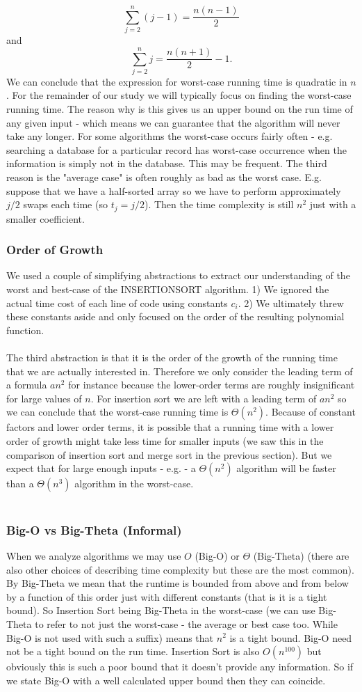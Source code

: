 \documentclass{scrartcl}
\theoremstyle{definition}
\theoremstyle{definition}
\theoremstyle{remark}
\numberwithin{equation}{section}
\begin{document}
$$\sum_{j=2}^n(j-1)=\frac{n(n-1)}{2}$$
and
$$\sum_{j=2}^nj=\frac{n(n+1)}{2}-1.$$
We can conclude that the expression for worst-case running time is quadratic in $n$. For the remainder of our study we will typically focus on finding the worst-case running time. The reason why is this gives us an upper bound on the run time of any given input - which means we can guarantee that the algorithm will never take any longer. For some algorithms the worst-case occurs fairly often - e.g. searching a database for a particular record has worst-case occurrence when the information is simply not in the database. This may be frequent. The third reason is the "average case" is often roughly as bad as the worst case. E.g. suppose that we have a half-sorted array so we have to perform approximately $j/2$ swaps each time (so $t_j=j/2$). Then the time complexity is still $n^2$ just with a smaller coefficient.
\subsubsection{Order of Growth}
We used a couple of simplifying abstractions to extract our understanding of the worst and best-case of the INSERTIONSORT algorithm. 1) We ignored the actual time cost of each line of code using constants $c_i$. 2) We ultimately threw these constants aside and only focused on the order of the resulting polynomial function.\\
\\
The third abstraction is that it is the order of the growth of the running time that we are actually interested in. Therefore we only consider the leading term of a formula $an^2$ for instance because the lower-order terms are roughly insignificant for large values of $n$. For insertion sort we are left with a leading term of $an^2$ so we can conclude that the worst-case running time is $\Theta(n^2)$. Because of constant factors and lower order terms, it is possible that a running time with a lower order of growth might take less time for smaller inputs (we saw this in the comparison of insertion sort and merge sort in the previous section). But we expect that for large enough inputs - e.g. - a $\Theta(n^2)$ algorithm will be faster than a $\Theta(n^3)$ algorithm in the worst-case.\\
\\
\subsubsection{Big-O vs Big-Theta (Informal)}
When we analyze algorithms we may use $O$ (Big-O) or $\Theta$ (Big-Theta) (there are also other choices of describing time complexity but these are the most common). By Big-Theta we mean that the runtime is bounded from above and from below by a function of this order just with different constants (that is it is a tight bound). So Insertion Sort being Big-Theta in the worst-case (we can use Big-Theta to refer to not just the worst-case - the average or best case too. While Big-O is not used with such a suffix) means that $n^2$ is a tight bound. Big-O need not be a tight bound on the run time. Insertion Sort is also $O(n^100)$ but obviously this is such a poor bound that it doesn't provide any information. So if we state Big-O with a well calculated upper bound then they can coincide. 
\end{document}
